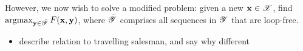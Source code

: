 However, we now wish to solve a modified problem:
given a new $\mathbf{x} \in \mathscr{X}$, find $\operatorname*{argmax}_{\mathbf{y} \in \bar{\mathscr{Y}}} F( \mathbf{x}, \mathbf{y} )$,
where $\bar{\mathscr{Y}}$ comprises all sequences in $\mathscr{Y}$ that are loop-free.

{\color{red!75}
\begin{itemize}
	\item describe relation to travelling salesman, and say why different
\end{itemize}
}





